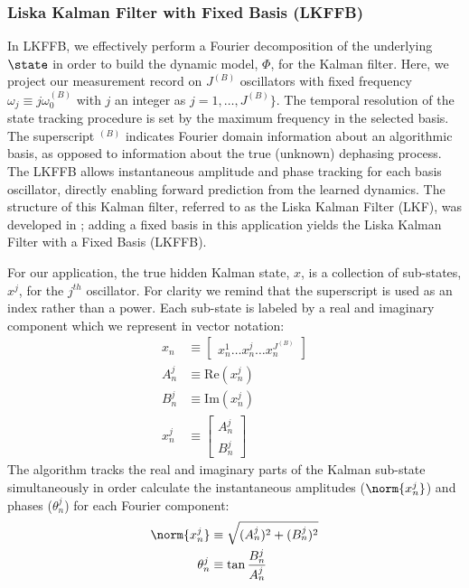 \subsubsection{Liska Kalman Filter with Fixed Basis (LKFFB)}
In LKFFB, we effectively perform a Fourier decomposition of the underlying $\state$ in order to build the dynamic model, $\Phi$, for the Kalman filter.   Here, we project our measurement record on $J^{(B)}$ oscillators with fixed frequency $\omega_{j}\equiv j\omega_0^{(B)}$ with $j$ an integer as $j = 1, \hdots, J^{(B)}\}$. The temporal resolution of the state tracking procedure is set by the maximum frequency in the selected basis.  The superscript $ ^{(B)}$ indicates Fourier domain information about an algorithmic basis, as opposed to information about the true (unknown) dephasing process.  The LKFFB allows instantaneous amplitude and phase tracking for each basis oscillator, directly enabling forward prediction from the learned dynamics.  The structure of this Kalman filter, referred to as the Liska Kalman Filter (LKF), was developed in \cite{livska2007}; adding a fixed basis in this application yields the Liska Kalman Filter with a Fixed Basis (LKFFB).

For our application, the true hidden Kalman state, $x$, is a collection of sub-states, $x^j$, for the $j^{th}$ oscillator. For clarity we remind that the superscript is used as an index rather than a power.  Each sub-state is labeled by a real and imaginary component which we represent in vector notation: 
\begin{align}
x_n & \equiv \begin{bmatrix} x^{1}_{n} \hdots x^{j}_{n} \hdots x^{J^{(B)}}_{n} \end{bmatrix} \\
A^j_{n} & \equiv \textrm{Re}(x^{j}_{n}) \\
B^j_{n} & \equiv \textrm{Im}(x^{j}_{n}) \\
x^j_n & \equiv \begin{bmatrix} A^j_{n} \\ B^j_{n}  \end{bmatrix}
\end{align} 
The algorithm tracks the real and imaginary parts of the Kalman sub-state simultaneously in order calculate the instantaneous amplitudes ($\norm{x^j_n}$) and phases ($\theta^{j}_{n}$)  for each Fourier component:
\begin{align}
\norm{x^j_n} & \equiv \sqrt{(A^j_{n})^2 + (B^j_{n})^2} \\
\theta^{j}_{n} & \equiv \tan{\frac{B^j_{n}}{A^j_{n}}}
\end{align}

